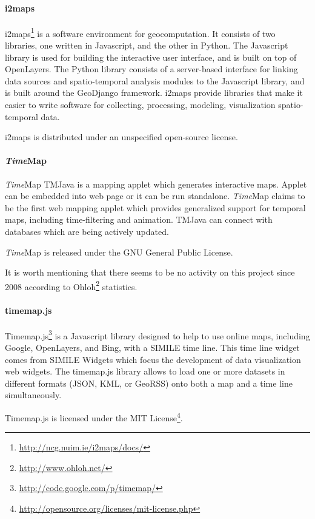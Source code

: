 \documentclass[a4paper,12pt,oneside]{book}
\begin{document}
\paragraph{i2maps} i2maps\footnote{\url{http://ncg.nuim.ie/i2maps/docs/}} is a software environment for geocomputation.
It consists of two libraries, one written in Javascript, and the other in Python.
The Javascript library is used for building the interactive user interface, and is built on top of OpenLayers.
The Python library consists of a server-based interface for linking data sources
and spatio-temporal analysis modules to the Javascript library, and is built around the GeoDjango framework.
i2maps provide libraries that make it easier to write software for collecting,
processing, modeling, visualization spatio-temporal data.

i2maps is distributed under an unspecified open-source license.

\paragraph{\emph{Time}Map} \emph{Time}Map TMJava is a mapping applet
which generates interactive maps. Applet can be embedded into web page
or it can be run standalone.
\emph{Time}Map claims to be the first web mapping applet which provides
generalized support for temporal maps, including time-filtering and animation.
TMJava can connect with databases which are being actively updated.

\emph{Time}Map is released under the GNU General Public License.

It is worth mentioning that there seems to be no activity on this project since 2008 according to
Ohloh\footnote{\url{http://www.ohloh.net/}} statistics.

\paragraph{timemap.js}
Timemap.js\footnote{\url{http://code.google.com/p/timemap/}}
is a Javascript library designed to help to use online maps,
including Google, OpenLayers, and Bing, with a SIMILE time line.
This time line widget comes from SIMILE Widgets which focus the development of data visualization web widgets.
The timemap.js library allows to load one or more datasets in different formats (JSON, KML, or GeoRSS)
onto both a map and a time line simultaneously.

Timemap.js is licensed under the MIT License\footnote{\url{http://opensource.org/licenses/mit-license.php}}.
\end{document}

